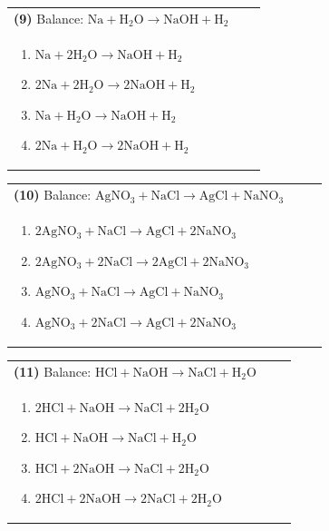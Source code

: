 \documentclass{article}
\begin{document}
\vspace{0.2cm}
\noindent \begin{tabular}{|p{0.9\linewidth}|}
\hline
\vspace{0.2cm}
\textbf{(9)} Balance: \(\mathrm{Na + H_2O \rightarrow NaOH + H_2}\)\\
\begin{minipage}[t]{0.85\linewidth}
\begin{enumerate}[label=\alph*.]
   \item \(\mathrm{Na + 2H_2O \rightarrow NaOH + H_2}\)
   \item \(\mathrm{2Na + 2H_2O \rightarrow 2NaOH + H_2}\)
   \item \(\mathrm{Na + H_2O \rightarrow NaOH + H_2}\)
   \item \(\mathrm{2Na + H_2O \rightarrow 2NaOH + H_2}\)
\end{enumerate}
\end{minipage}\\
\hline
\end{tabular}

\vspace{0.2cm}
\noindent \begin{tabular}{|p{0.9\linewidth}|}
\hline
\vspace{0.2cm}
\textbf{(10)} Balance: \(\mathrm{AgNO_3 + NaCl \rightarrow AgCl + NaNO_3}\)\\
\begin{minipage}[t]{0.85\linewidth}
\begin{enumerate}[label=\alph*.]
   \item \(\mathrm{2AgNO_3 + NaCl \rightarrow AgCl + 2NaNO_3}\)
   \item \(\mathrm{2AgNO_3 + 2NaCl \rightarrow 2AgCl + 2NaNO_3}\)
   \item \(\mathrm{AgNO_3 + NaCl \rightarrow AgCl + NaNO_3}\)
   \item \(\mathrm{AgNO_3 + 2NaCl \rightarrow AgCl + 2NaNO_3}\)
\end{enumerate}
\end{minipage}\\
\hline
\end{tabular}

\vspace{0.2cm}
\noindent \begin{tabular}{|p{0.9\linewidth}|}
\hline
\vspace{0.2cm}
\textbf{(11)} Balance: \(\mathrm{HCl + NaOH \rightarrow NaCl + H_2O}\)\\
\begin{minipage}[t]{0.85\linewidth}
\begin{enumerate}[label=\alph*.]
   \item \(\mathrm{2HCl + NaOH \rightarrow NaCl + 2H_2O}\)
   \item \(\mathrm{HCl + NaOH \rightarrow NaCl + H_2O}\)
   \item \(\mathrm{HCl + 2NaOH \rightarrow NaCl + 2H_2O}\)
   \item \(\mathrm{2HCl + 2NaOH \rightarrow 2NaCl + 2H_2O}\)
\end{enumerate}
\end{minipage}\\
\hline
\end{tabular}
\end{document}
